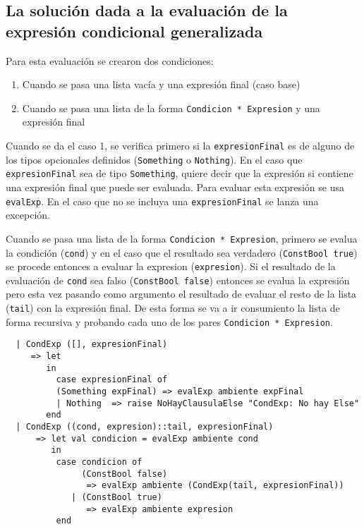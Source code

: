 \documentclass[12pt, times]{simauth}
\begin{document}
\subsection{La solución dada a la evaluación de la expresión condicional generalizada}

Para esta evaluación se crearon dos condiciones:

\begin{enumerate}
    \item Cuando se pasa una lista vacía y una expresión final (caso base)
    \item Cuando se pasa una lista de la forma \texttt{Condicion * Expresion} y una expresión final
\end{enumerate}

Cuando se da el caso 1, se verifica primero si la \texttt{expresionFinal} es de alguno de los tipos opcionales definidos (\texttt{Something} o \texttt{Nothing}). En el caso que \texttt{expresionFinal} sea de tipo \texttt{Something}, quiere decir que la expresión si contiene una expresión final que puede ser evaluada. Para evaluar esta expresión se usa \texttt{evalExp}. En el caso que no se incluya una \texttt{expresionFinal} se lanza una excepción.

Cuando se pasa una lista de la forma \texttt{Condicion * Expresion}, primero se evalua la condición (\texttt{cond}) y en el caso que el resultado sea verdadero (\texttt{ConstBool true}) se procede entonces a evaluar la expresion (\texttt{expresion}). Si el resultado de la evaluación de \texttt{cond} sea falso (\texttt{ConstBool false}) entonces se evalua la expresión pero esta vez pasando como argumento el resultado de evaluar el resto de la lista (\texttt{tail}) con la expresión final. De esta forma se va a ir consumiento la lista de forma recursiva y probando cada uno de los pares \texttt{Condicion * Expresion}.

\begin{verbatim}
  | CondExp ([], expresionFinal)
     => let
        in
          case expresionFinal of
          (Something expFinal) => evalExp ambiente expFinal
          | Nothing  => raise NoHayClausulaElse "CondExp: No hay Else"
        end
  | CondExp ((cond, expresion)::tail, expresionFinal)
      => let val condicion = evalExp ambiente cond
         in 
          case condicion of
               (ConstBool false) 
                => evalExp ambiente (CondExp(tail, expresionFinal))
             | (ConstBool true)  
                => evalExp ambiente expresion
          end 
\end{verbatim}
\end{document}
